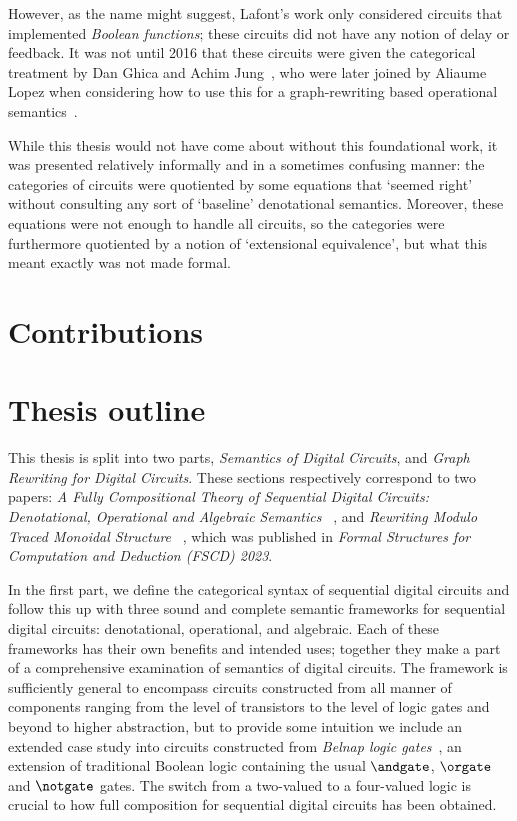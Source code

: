 However, as the name might suggest, Lafont's work only considered circuits that
implemented \emph{Boolean functions}; these circuits did not have any notion of
delay or feedback.
It was not until 2016 that these circuits were given the categorical treatment
by Dan Ghica and Achim Jung~\cite{ghica2016categorical}, who were later joined
by Aliaume Lopez when considering how to use this for a graph-rewriting based
operational semantics~\cite{ghica2017diagrammatic}.

While this thesis would not have come about without this foundational work, it
was presented relatively informally and in a sometimes confusing manner:
the categories of circuits were quotiented by some equations that `seemed right'
without consulting any sort of `baseline' denotational semantics.
Moreover, these equations were not enough to handle all circuits, so the
categories were furthermore quotiented by a notion of `extensional equivalence',
but what this meant exactly was not made formal.

\section{Contributions}


\section{Thesis outline}

This thesis is split into two parts, \emph{Semantics of Digital Circuits}, and
\emph{Graph Rewriting for Digital Circuits}.
These sections respectively correspond to two papers:
\emph{%
    A Fully Compositional Theory of Sequential Digital Circuits:
    Denotational, Operational and Algebraic Semantics%
}~\cite{ghica2024fully}, and \emph{%
    Rewriting Modulo Traced Monoidal Structure%
}~\cite{ghica2023rewriting}, which was published in
\emph{Formal Structures for Computation and Deduction (FSCD) 2023}.

In the first part, we define the categorical syntax of sequential digital
circuits and follow this up with three sound and complete semantic frameworks
for sequential digital circuits: denotational, operational, and algebraic.
Each of these frameworks has their own benefits and intended uses; together they
make a part of a comprehensive examination of semantics of digital circuits.
The framework is sufficiently general to encompass circuits constructed from
all manner of components ranging from the level of transistors to the level of
logic gates and beyond to higher abstraction, but to provide some intuition we
include an extended case study into circuits constructed from
\emph{Belnap logic gates}~\cite{belnap1977useful}, an extension of traditional
Boolean logic containing the usual \(\andgate\), \(\orgate\) and \(\notgate\)
gates.
The switch from a two-valued to a four-valued logic is crucial to how full
composition for sequential digital circuits has been obtained.

